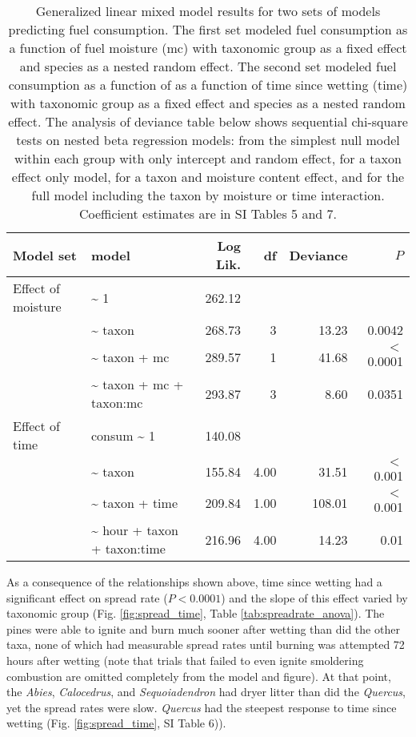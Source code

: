 \documentclass[letterpaper,12pt]{article}
\begin{document}
\begin{table}[h]
  \caption{Generalized linear mixed model results for two sets of models
    predicting fuel consumption. The first set modeled fuel consumption as a
    function of fuel moisture (mc) with taxonomic group as a fixed effect and
    species as a nested random effect. The second set modeled fuel consumption
    as a function of as a function of time since wetting (time) with taxonomic
    group as a fixed effect and species as a nested random effect. The analysis
    of deviance table below shows sequential chi-square tests on nested beta
    regression models: from the simplest null model within each group with only
    intercept and random effect, for a taxon effect only model, for a taxon and
    moisture content effect, and for the full model including the taxon by
    moisture or time interaction. Coefficient estimates are in SI Tables 5 and
    7.}
  \label{tab:consume_anova}
  \centering

  \begin{tabular}{llrrrr}
\toprule
Model set & model & Log Lik. & df & Deviance & $P$ \\ 
\midrule
  Effect of moisture &   \~{} 1 & 262.12 &  &  &  \\ 
   &  \~{} taxon & 268.73 & 3 & 13.23 & 0.0042 \\ 
   & \~{} taxon + mc & 289.57 & 1 & 41.68 & $<$ 0.0001 \\ 
   & \~{} taxon + mc + taxon:mc & 293.87 & 3 & 8.60 & 0.0351 \\ 
\midrule
Effect of time &  consum \~{} 1 & 140.08 &  &  &  \\ 
 & \~{} taxon & 155.84 & 4.00 & 31.51 & $<$ 0.001 \\ 
 & \~{} taxon + time & 209.84 & 1.00 & 108.01 & $<$ 0.001 \\ 
 & \~{} hour + taxon + taxon:time & 216.96 & 4.00 & 14.23 & 0.01 \\ 
    \bottomrule
    \end{tabular}
\end{table}


As a consequence of the relationships shown above, time since wetting had a
significant effect on spread rate ($P < 0.0001$) and the slope of this effect
varied by taxonomic group (Fig. \ref{fig:spread_time}, Table
\ref{tab:spreadrate_anova}). The pines were able to ignite and burn much sooner
after wetting than did the other taxa, none of which had measurable spread
rates until burning was attempted 72 hours after wetting (note that trials that
failed to even ignite smoldering combustion are omitted completely from the
model and figure). At that point, the \emph{Abies}, \emph{Calocedrus}, and
\emph{Sequoiadendron} had dryer litter than did the \emph{Quercus}, yet the
spread rates were slow. \emph{Quercus} had the steepest response to time since
wetting (Fig. \ref{fig:spread_time}, SI Table 6)).
\end{document}
